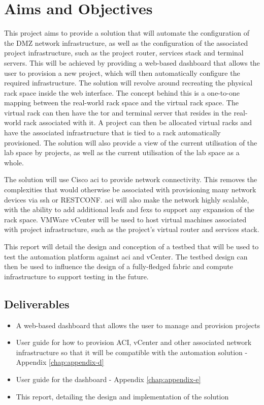 \section{Aims and Objectives}
\label{intro:aims}

This project aims to provide
a solution that will automate the
configuration of the DMZ network
infrastructure, as well as the configuration of the associated project
infrastructure, such as the project router, services stack and terminal
servers. This will be achieved by providing a web-based dashboard that allows
the user to provision a new project, which will then automatically configure
the required infrastructure. The solution will revolve around recreating the
physical rack space inside the web interface. The concept behind this is a
one-to-one mapping between the real-world rack space and the virtual rack space.
The virtual rack can then have the \gls{tor} and terminal server that resides
in the real-world rack associated with it. A project can then be allocated
virtual racks and have the associated infrastructure that is tied to a rack
automatically provisioned. The solution will also provide a view of the current
utilisation of the lab space by projects, as well as the current utilisation of
the lab space as a whole.

The solution will use Cisco \gls{aci} to provide
network connectivity. This removes the complexities that would otherwise be
associated with provisioning many network devices via \gls{ssh} or RESTCONF.
\gls{aci} will also make the network highly scalable, with the ability to add
additional leafs and \gls{fex}s to support any expansion of the rack space.
VMWare vCenter will be used to host virtual machines associated with project
infrastructure, such as the project's virtual router and services stack.

This
report will detail the design and conception of a testbed that will be used to
test the automation platform against \gls{aci} and vCenter. The testbed design
can then be used to influence the design of a fully-fledged fabric and compute infrastructure to support testing in the future.
\subsection{Deliverables}
\label{intro:aims:deliverables}

\begin{itemize}
      \item A web-based dashboard that allows the user to manage
            and provision projects
            
      \item User guide for how to provision ACI, vCenter and other associated
            network infrastructure so that it will be compatible with the automation
            solution - Appendix \ref{chap:appendix-d}
            
      \item User guide for the dashboard - Appendix \ref{chap:appendix-e}
            
      \item This report, detailing the design and implementation of the
            solution
\end{itemize}

